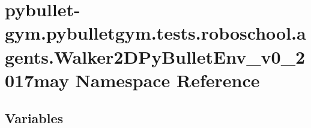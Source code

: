 \hypertarget{namespacepybullet-gym_1_1pybulletgym_1_1tests_1_1roboschool_1_1agents_1_1_walker2_d_py_bullet_env__v0__2017may}{}\section{pybullet-\/gym.pybulletgym.\+tests.\+roboschool.\+agents.\+Walker2\+D\+Py\+Bullet\+Env\+\_\+v0\+\_\+2017may Namespace Reference}
\label{namespacepybullet-gym_1_1pybulletgym_1_1tests_1_1roboschool_1_1agents_1_1_walker2_d_py_bullet_env__v0__2017may}
\subsection*{Variables}
